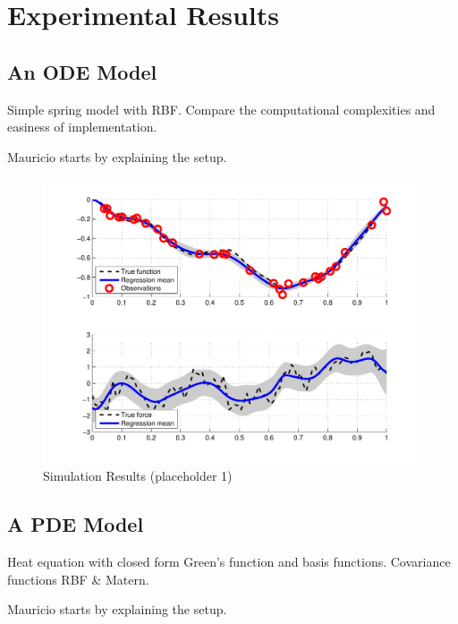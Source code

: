 \documentclass[journal]{IEEEtran}
\newcommand{\simo}[1]{{\color{red}#1}}
\begin{document}
\section{Experimental Results}

\subsection{An ODE Model}
%
\simo{Simple spring model with RBF. Compare the computational complexities and easiness of implementation.}

\simo{Mauricio starts by explaining the setup.}

\begin{figure}[!t]
\centering
\includegraphics[width=\columnwidth]{placeholder1}
\caption{Simulation Results (placeholder 1)}
\label{fig_sim}
\end{figure}


\subsection{A PDE Model}
%
\simo{Heat equation with closed form Green's function and basis functions. Covariance functions RBF \& Matern.}

\simo{Mauricio starts by explaining the setup.}
\end{document}
